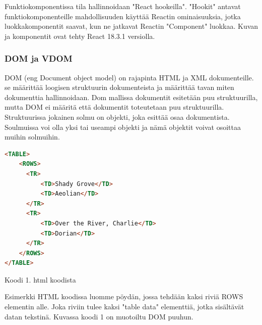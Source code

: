Funktiokomponentissa tila hallinnoidaan "React hookeilla"{}. 
"Hookit"{} antavat funktiokomponenteille mahdollisuuden käyttää Reactin ominaisuuksia, 
jotka luokkakomponentit saavat, kun ne jatkavat Reactin "Component"{} luokkaa.
Kuvan \prevImageCount{} ja \theimgCounter{} komponentit ovat tehty React 18.3.1 versiolla.
\medskip



\subsubsection{DOM ja VDOM}





DOM (eng Document object model) on rajapinta HTML ja XML dokumenteille. 
se määrittää loogisen struktuurin dokumenteista ja määrittää tavan miten dokumenttia hallinnoidaan.
Dom mallissa dokumentit esitetään puu struktuurilla, mutta DOM ei määritä että dokumentit toteutetaan puu struktuurilla.
Struktuurissa jokainen solmu on objekti, joka esittää osaa dokumentista. 
Soulmuissa voi olla yksi tai useampi objekti ja nämä objektit voivat osoittaa muihin solmuihin.
\bigskip



    
\begin{tcolorbox}
\begin{lstlisting}[language=html]
<TABLE>
    <ROWS> 
      <TR> 
          <TD>Shady Grove</TD>
          <TD>Aeolian</TD> 
      </TR> 
      <TR>
          <TD>Over the River, Charlie</TD>
          <TD>Dorian</TD> 
      </TR> 
    </ROWS>
</TABLE>
\end{lstlisting}
\end{tcolorbox}
Koodi 1. html koodista
\medskip


Esimerkki HTML koodissa luomme pöydän, jossa tehdään kaksi riviä ROWS elementin alle. 
Joka riviin tulee kaksi "table data"{} elementtiä, jotka sisältävät datan tekstinä.
Kuvassa \nextImageCount {} koodi 1 on muotoiltu DOM puuhun.


